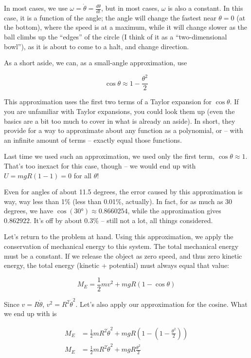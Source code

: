 \documentclass[8.01x]{subfiles}
\begin{document}
In most cases, we use $\displaystyle \omega = \dot{\theta} = \frac{d\theta}{dt}$, but in most cases, $\omega$ is also a constant. In this case, it is a function of the angle; the angle will change the fastest near $\theta = 0$ (at the bottom), where the speed is at a maximum, while it will change slower as the ball climbs up the ``edges'' of the circle (I think of it as a ``two-dimensional bowl''), as it is about to come to a halt, and change direction.

As a short aside, we can, as a small-angle approximation, use

\begin{equation}
\cos \theta \approx 1 - \frac{\theta^2}{2}
\end{equation}

This approximation uses the first two terms of a Taylor expansion for $\cos \theta$. If you are unfamiliar with Taylor expansions, you could look them up (even the basics are a bit too much to cover in what is already an aside). In short, they provide for a way to approximate about any function as a polynomial, or -- with an infinite amount of terms -- exactly equal those functions.

Last time we used such an approximation, we used only the first term, $\cos \theta \approx 1$. That's too inexact for this case, though -- we would end up with $U = m g R (1 - 1) = 0$ for all $\theta$!

Even for angles of about 11.5 degrees, the error caused by this approximation is way, way less than 1\% (less than 0.01\%, actually). In fact, for as much as 30 degrees, we have $\cos(\ang{30}) \approx 0.8660254$, while the approximation gives $0.862922$. It's off by about 0.3\% -- still not a lot, all things considered.

Let's return to the problem at hand. Using this approximation, we apply the conservation of mechanical energy to this system. The total mechanical energy must be a constant. If we release the object as zero speed, and thus zero kinetic energy, the total energy (kinetic + potential) must always equal that value:

\begin{equation}
M_E = \frac{1}{2} m v^2 + m g R(1 - \cos \theta)
\end{equation}

Since $v = R \dot{\theta}$, $v^2 = R^2 \dot{\theta}^2$. Let's also apply our approximation for the cosine. What we end up with is

\begin{align}
M_E &= \frac{1}{2} m R^2 \dot{\theta}^2 + m g R(1 - (1 - \frac{\theta^2}{2}))\\
M_E &= \frac{1}{2} m R^2 \dot{\theta}^2 + m g R \frac{\theta^2}{2}
\end{align}
\end{document}
